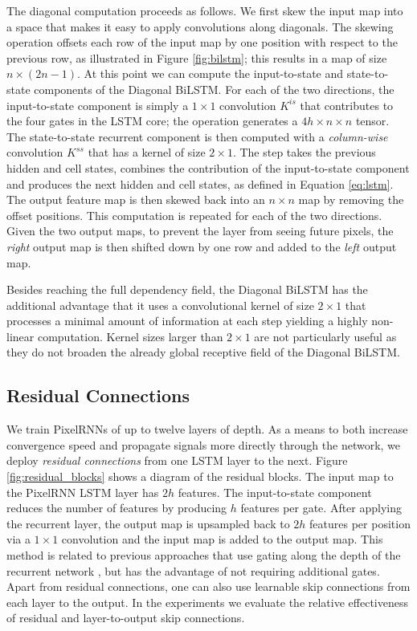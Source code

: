 \documentclass{article}
\begin{document}
The diagonal computation proceeds as follows. We first skew the input map into a space that makes it easy to apply convolutions along diagonals. The {skewing} operation offsets each row of the input map by one position with respect to the previous row, as illustrated in Figure \ref{fig:bilstm}; this results in a map of size $n \times (2n-1)$. At this point we can compute the input-to-state and state-to-state components of the Diagonal BiLSTM. For each of the two directions, the input-to-state component is simply a $1 \times 1$ convolution $K^{is}$ that contributes to the four gates in the LSTM core; the operation generates a $4 h \times n \times n$ tensor. The state-to-state recurrent component is then computed with a \emph{column-wise} convolution $K^{ss}$ that has a kernel of size $2 \times 1$. The step takes the previous hidden and cell states, combines the contribution of the input-to-state component and produces the next hidden and cell states, as defined in Equation \ref{eq:lstm}. The output feature map is then skewed back into an $n \times n$ map by removing the offset positions. This computation is repeated for each of the two directions. Given the two output maps, to prevent the layer from seeing future pixels, the \emph{right} output map is then shifted down by one row and added to the \emph{left} output map.
 
Besides reaching the full dependency field, the Diagonal BiLSTM has the additional advantage that it uses a convolutional kernel of size $2\times1$ that processes a minimal amount of information at each step yielding a highly non-linear computation. Kernel sizes larger than $2\times1$ are not particularly useful as they do not broaden the already global receptive field of the Diagonal BiLSTM. 

\subsection{Residual Connections}
\label{sect:residual}

We train PixelRNNs of up to twelve layers of depth. As a means to both increase convergence speed and propagate signals more directly through the network, we deploy \emph{residual connections} \cite{DBLP:journals/corr/HeZRS15} from one LSTM layer to the next. Figure \ref{fig:residual_blocks} shows a diagram of the residual blocks. The input map to the PixelRNN LSTM layer has $2h$ features. The input-to-state component reduces the number of features by producing $h$ features per gate. After applying the recurrent layer, the output map is upsampled back to $2h$ features per position via a $1\times1 $ convolution and the input map is added to the output map. This method is related to previous approaches that use gating along the depth of the recurrent network \cite{DBLP:journals/corr/KalchbrennerDG15,zhang2016highway}, but has the advantage of not requiring additional gates. Apart from residual connections, one can also use learnable skip connections from each layer to the output. In the experiments we evaluate the relative effectiveness of residual and layer-to-output skip connections. 
	
\end{document}

